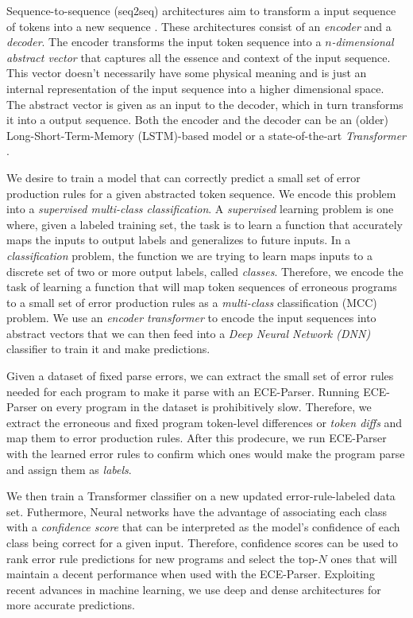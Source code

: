 Sequence-to-sequence (seq2seq) architectures aim to
transform a input sequence of tokens into a new sequence \citep{Sutskever_2014}.
These architectures consist of an \emph{encoder} and a \emph{decoder}. The
encoder transforms the input token sequence into a \emph{$n$-dimensional
abstract vector} that captures all the essence and context of the input
sequence. This vector doesn't necessarily have some physical meaning and is just
an internal representation of the input sequence into a higher dimensional
space. The abstract vector is given as an input to the decoder, which in turn
transforms it into a output sequence. Both the encoder and the decoder can be an
(older) Long-Short-Term-Memory (LSTM)-based model \citep{Hochreiter_1997} or a
state-of-the-art \emph{Transformer} \citep{Vaswani_2017}.

 We desire to train a model that can correctly
predict a small set of error production rules for a given abstracted token
sequence. We encode this problem into a \emph{supervised multi-class
classification}. A \emph{supervised} learning problem is one where, given a
labeled training set, the task is to learn a function that accurately maps the
inputs to output labels and generalizes to future inputs. In a
\emph{classification} problem, the function we are trying to learn maps inputs
to a discrete set of two or more output labels, called \emph{classes}.
Therefore, we encode the task of learning a function that will map token
sequences of erroneous programs to a small set of error production rules as a
\emph{multi-class} classification (MCC) problem. We use an \emph{encoder
transformer} to encode the input sequences into abstract vectors that we can
then feed into a \emph{Deep Neural Network (DNN)} classifier to train it and
make predictions.

Given a dataset of fixed parse errors, we can extract the small set of error
rules needed for each program to make it parse with an ECE-Parser. Running ECE-Parser on
every program in the dataset is prohibitively slow. Therefore, we extract the
erroneous and fixed program token-level differences or \emph{token diffs} and
map them to error production rules. After this prodecure, we run ECE-Parser with the
learned error rules to confirm which ones would make the program parse and
assign them as \emph{labels}.

We then train a Transformer classifier on a new updated error-rule-labeled data
set. Futhermore, Neural networks have the advantage of associating each class
with a \emph{confidence score} that can be interpreted as the model's confidence
of each class being correct for a given input. Therefore, confidence scores can
be used to rank error rule predictions for new programs and select the top-$N$
ones that will maintain a decent performance when used with the ECE-Parser. Exploiting
recent advances in machine learning, we use deep and dense architectures
\citep{Schmidhuber_2015} for more accurate predictions.

